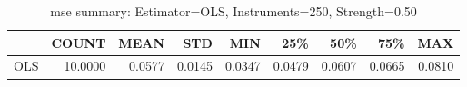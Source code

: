 \begin{table}[ht]
\centering
\caption{mse summary: Estimator=OLS, Instruments=250, Strength=0.50}
\begin{tabular}{lrrrrrrrr}
\toprule
 & COUNT & MEAN & STD & MIN & 25\% & 50\% & 75\% & MAX \\
\midrule
OLS & 10.0000 & 0.0577 & 0.0145 & 0.0347 & 0.0479 & 0.0607 & 0.0665 & 0.0810 \\
\bottomrule
\end{tabular}
\end{table}
